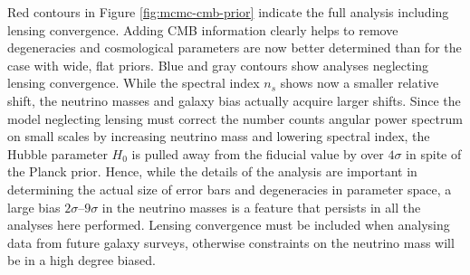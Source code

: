 Red contours in Figure \ref{fig:mcmc-cmb-prior} indicate the full analysis including lensing convergence. Adding CMB information clearly helps to remove degeneracies and cosmological parameters are now better determined than for the case with wide, flat priors. Blue and gray contours show analyses neglecting lensing convergence. While the spectral index $n_s$ shows now a smaller relative shift, the neutrino masses and galaxy bias actually acquire larger shifts. Since the model neglecting lensing must correct the number counts angular power spectrum on small scales by increasing neutrino mass and lowering spectral index, the Hubble parameter $H_0$ is pulled away from the fiducial value by over $4\sigma$ in spite of the Planck prior. Hence, while the details of the analysis are important in determining the actual size of error bars and degeneracies in parameter space, a large bias $2\sigma$--$9\sigma$ in the neutrino masses is a feature that persists in all the analyses here performed. Lensing convergence must be included when analysing data from future galaxy surveys, otherwise constraints on the neutrino mass will be in a high degree biased.  


